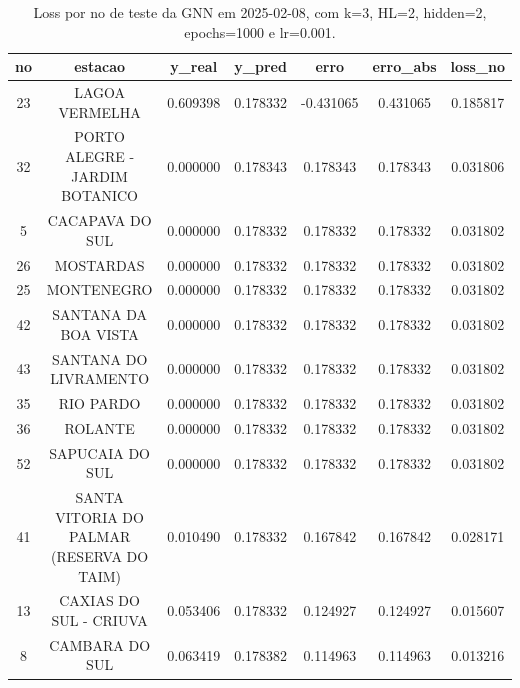 \begin{table}[h]
\centering
\caption{Loss por no de teste da GNN em 2025-02-08, com k=3, HL=2, hidden=2, epochs=1000 e lr=0.001.}
\label{tab:gnn_loss_k3_hl2_h2_e1000_d20250208}
\begin{tabular}{ccccccc}
\toprule
no & estacao & y\_real & y\_pred & erro & erro\_abs & loss\_no \\
\midrule
23 & LAGOA VERMELHA & 0.609398 & 0.178332 & -0.431065 & 0.431065 & 0.185817 \\
32 & PORTO ALEGRE - JARDIM BOTANICO & 0.000000 & 0.178343 & 0.178343 & 0.178343 & 0.031806 \\
5 & CACAPAVA DO SUL & 0.000000 & 0.178332 & 0.178332 & 0.178332 & 0.031802 \\
26 & MOSTARDAS & 0.000000 & 0.178332 & 0.178332 & 0.178332 & 0.031802 \\
25 & MONTENEGRO & 0.000000 & 0.178332 & 0.178332 & 0.178332 & 0.031802 \\
42 & SANTANA DA BOA VISTA & 0.000000 & 0.178332 & 0.178332 & 0.178332 & 0.031802 \\
43 & SANTANA DO LIVRAMENTO & 0.000000 & 0.178332 & 0.178332 & 0.178332 & 0.031802 \\
35 & RIO PARDO & 0.000000 & 0.178332 & 0.178332 & 0.178332 & 0.031802 \\
36 & ROLANTE & 0.000000 & 0.178332 & 0.178332 & 0.178332 & 0.031802 \\
52 & SAPUCAIA DO SUL & 0.000000 & 0.178332 & 0.178332 & 0.178332 & 0.031802 \\
41 & SANTA VITORIA DO PALMAR (RESERVA DO TAIM) & 0.010490 & 0.178332 & 0.167842 & 0.167842 & 0.028171 \\
13 & CAXIAS DO SUL - CRIUVA & 0.053406 & 0.178332 & 0.124927 & 0.124927 & 0.015607 \\
8 & CAMBARA DO SUL & 0.063419 & 0.178382 & 0.114963 & 0.114963 & 0.013216 \\
\bottomrule
\end{tabular}
\end{table}
